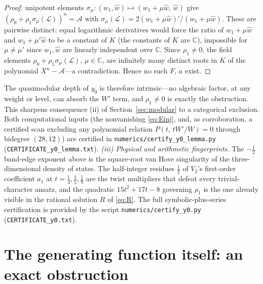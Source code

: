 \documentclass[11pt]{article}
\theoremstyle{plain}
\theoremstyle{remark}
\begin{document}
\begin{proof}
unipotent elements $\sigma_\mu:(w_1,\hat w)\mapsto(w_1+\mu \hat w,\,\hat w)$ give
$(\rho_0+\rho_1\sigma_\mu(\mathcal{L}))^n=\mathcal{A}$ with
$\sigma_\mu(\mathcal{L})=2(w_1+\mu \hat w)'/(w_1+\mu \hat w)$. These are pairwise distinct: equal
logarithmic derivatives would force the ratio of $w_1+\mu \hat w$ and $w_1+\mu'\hat w$ to be a
constant of $K$ (the constants of $K$ are $\mathbb{C}$), impossible for $\mu\neq\mu'$ since
$w_1,\hat w$ are linearly independent over $\mathbb{C}$. Since $\rho_1\neq0$, the field elements
$\rho_0+\rho_1\sigma_\mu(\mathcal{L})$, $\mu\in\mathbb{C}$, are infinitely many distinct roots
in $K$ of the polynomial $X^n-\mathcal{A}$---a contradiction. Hence no such $F$, $a$ exist.
\end{proof}

The quasimodular depth of $y_0$ is therefore intrinsic---no algebraic factor, at any weight or
level, can absorb the $W'$ term, and $\rho_1\neq0$ is exactly the obstruction. This sharpens
consequence (ii) of Section~\ref{sec:modular} to a categorical exclusion. Both
computational inputs (the nonvanishing \eqref{eq:Einj}, and, as corroboration, a certified
scan excluding any polynomial relation $P(t,\,tW'/W)=0$ through bidegree $(28,12)$) are
certified in \texttt{numerics/certify\_y0\_lemma.py}
(\texttt{CERTIFICATE\_y0\_lemma.txt}).
\emph{(iii) Physical and arithmetic fingerprints.} The $-\tfrac12$ band-edge exponent above is
the square-root van Hove singularity of the three-dimensional density of states. The
half-integer residues $\tfrac12$ of $V_2$'s first-order coefficient $a_1$ at
$t=\tfrac14,\tfrac15,\tfrac19$ are the twist multipliers that defeat every trivial-character
ansatz, and the quadratic $15t^2+17t-8$ governing $\rho_1$ is the one already visible in the
rational solution $R$ of \eqref{eq:R}. The full
symbolic-plus-series certification is provided by the script \texttt{numerics/certify\_y0.py}
(\texttt{CERTIFICATE\_y0.txt}).

\section{The generating function itself: an exact obstruction}
\label{sec:phiobs}
\end{document}
